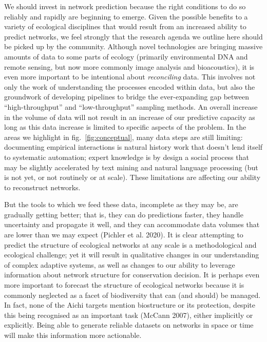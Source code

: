 \documentclass[11pt]{article}
\begin{document}
We should invest in network prediction because the right conditions to
do so reliably and rapidly are beginning to emerge. Given the possible
benefits to a variety of ecological disciplines that would result from
an increased ability to predict networks, we feel strongly that the
research agenda we outline here should be picked up by the community.
Although novel technologies are bringing massive amounts of data to some
parts of ecology (primarily environmental DNA and remote sensing, but
now more commonly image analysis and bioacoustics), it is even more
important to be intentional about \emph{reconciling} data. This involves
not only the work of understanding the processes encoded within data,
but also the groundwork of developing pipelines to bridge the
ever-expanding gap between ``high-throughput'' and ``low-throughput''
sampling methods. An overall increase in the volume of data will not
result in an increase of our predictive capacity as long as this data
increase is limited to specific aspects of the problem. In the areas we
highlight in fig.~\ref{fig:conceptual}, many data steps are still
limiting: documenting empirical interactions is natural history work
that doesn't lend itself to systematic automation; expert knowledge is
by design a social process that may be slightly accelerated by text
mining and natural language processing (but is not yet, or not routinely
or at scale). These limitations are affecting our ability to reconstruct
networks.

But the tools to which we feed these data, incomplete as they may be,
are gradually getting better; that is, they can do predictions faster,
they handle uncertainty and propagate it well, and they can accommodate
data volumes that are lower than we may expect (Pichler et al. 2020). It
is clear attempting to predict the structure of ecological networks at
any scale is a methodological and ecological challenge; yet it will
result in qualitative changes in our understanding of complex adaptive
systems, as well as changes to our ability to leverage information about
network structure for conservation decision. It is perhaps even more
important to forecast the structure of ecological networks because it is
commonly neglected as a facet of biodiversity that can (and should) be
managed. In fact, none of the Aichi targets mention biostructure or its
protection, despite this being recognised as an important task (McCann
2007), either implicitly or explicitly. Being able to generate reliable
datasets on networks in space or time will make this information more
actionable.
\end{document}
